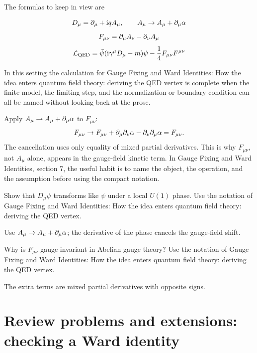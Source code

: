 The formulas to keep in view are

\[
  D_\mu=\partial_\mu+\mathrm i qA_\mu,\qquad A_\mu\to A_\mu+\partial_\mu\alpha
\]
\[
  F_{\mu\nu}=\partial_\mu A_\nu-\partial_\nu A_\mu
\]
\[
  \mathcal L_{\mathrm{QED}}=\bar\psi(\mathrm i\gamma^\mu D_\mu-m)\psi-\frac14F_{\mu\nu}F^{\mu\nu}
\]

In this setting the calculation for Gauge Fixing and Ward Identities: How the idea enters quantum field theory: deriving the QED vertex is complete when the finite model, the limiting step, and the normalization or boundary condition can all be named without looking back at the prose.




\begin{example}
Apply \(A_\mu\to A_\mu+\partial_\mu\alpha\) to \(F_{\mu\nu}\):
\[
  F_{\mu\nu}\to F_{\mu\nu}+\partial_\mu\partial_\nu\alpha-\partial_\nu\partial_\mu\alpha=F_{\mu\nu}.
\]
The cancellation uses only equality of mixed partial derivatives.  This is why \(F_{\mu\nu}\), not \(A_\mu\) alone, appears in the gauge-field kinetic term.  In Gauge Fixing and Ward Identities, section 7, the useful habit is to name the object, the operation, and the assumption before using the compact notation.
\end{example}



\begin{exercise}
Show that \(D_\mu\psi\) transforms like \(\psi\) under a local \(U(1)\) phase.  Use the notation of Gauge Fixing and Ward Identities: How the idea enters quantum field theory: deriving the QED vertex.
\begin{answer}
Use \(A_\mu\to A_\mu+\partial_\mu\alpha\); the derivative of the phase cancels the gauge-field shift.
\end{answer}
\end{exercise}

\begin{exercise}
Why is \(F_{\mu\nu}\) gauge invariant in Abelian gauge theory?  Use the notation of Gauge Fixing and Ward Identities: How the idea enters quantum field theory: deriving the QED vertex.
\begin{answer}
The extra terms are mixed partial derivatives with opposite signs.
\end{answer}
\end{exercise}



\section{Review problems and extensions: checking a Ward identity}

